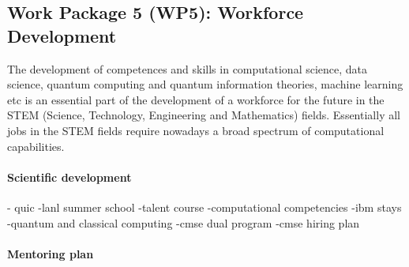 \documentclass[10pt]{article}
\begin{document}
\subsection{Work Package 5 (WP5): Workforce Development}

The development of competences and skills in computational science, data science, quantum computing and quantum information theories, machine learning etc is an essential part of the development of a workforce for the future in the STEM (Science, Technology, Engineering and Mathematics) fields. Essentially all jobs in the STEM fields require nowadays a broad spectrum of computational capabilities. 

\paragraph{Scientific development}
- quic
-lanl summer school
-talent course
-computational competencies
-ibm stays
-quantum and classical computing
-cmse dual program
-cmse hiring plan

\paragraph{Mentoring plan}
\end{document}
